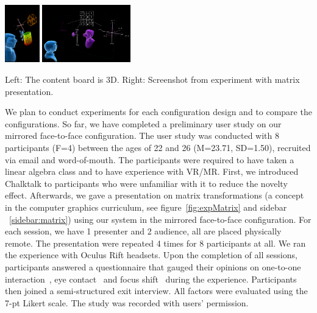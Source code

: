 \documentclass[sigchi-a]{acmart}
\begin{document}
\begin{marginfigure}
    \includegraphics[height = 2.5cm]{3d.png}
    \includegraphics[height = 2.5cm]{experimentMatrix.png}
    \caption{Left: The content board is 3D. Right: Screenshot from experiment with matrix presentation.}
    \label{fig:expMatrix}
\end{marginfigure}

We plan to conduct experiments for each configuration design and to compare the configurations. So far, we have completed a preliminary user study on our mirrored face-to-face configuration.
The user study was conducted with 8 participants (F=4) between the ages of 22 and 26 (M=23.71, SD=1.50), recruited via email and word-of-mouth.
The participants were required to have taken a linear algebra class and to have experience with VR/MR. First, we introduced Chalktalk to participants who were unfamiliar with it to reduce the novelty effect. Afterwards, we gave a presentation on matrix transformations (a concept in the computer graphics curriculum, see figure~\ref{fig:expMatrix} and sidebar ~\ref{sidebar:matrix}) using our system in the mirrored face-to-face configuration. For each session, we have 1 presenter and 2 audience, all are placed physically remote. The presentation were repeated 4 times for 8 participants at all. 
We ran the experience with Oculus Rift headsets. Upon the completion of all sessions, participants answered a questionnaire that gauged their opinions on one-to-one interaction~\cite{Lanir2008ClassroomPresentationSoftware}, eye contact~\cite{InsaPositionInClassroom} and focus shift~\cite{buxton1992telepresence} during the experience. Participants then joined a semi-structured exit interview. All factors were evaluated using the 7-pt Likert scale. The study was recorded with users' permission.
\end{document}
